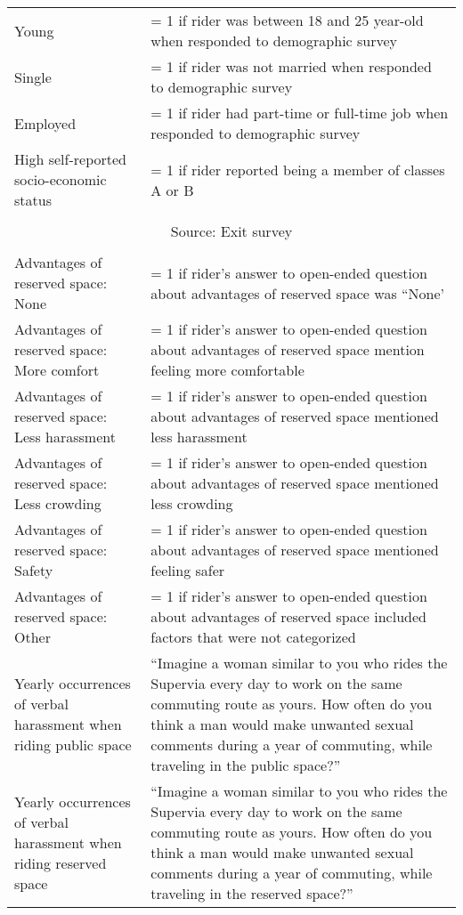 \begin{table}[H]
\begin{tabular}{p{.4\linewidth}p{.6\linewidth}}
Young	&	= 1 if rider was between 18 and 25 year-old when responded to demographic survey	\\
Single	&	= 1 if rider was not married when responded to demographic survey	\\
Employed	&	= 1 if rider had part-time or full-time job when responded to demographic survey	\\
High self-reported socio-economic status	&	= 1 if rider reported being a member of classes A or B	\\\\[-1.8ex]
\hline
\multicolumn{2}{c}{Source: Exit survey} \\
\hline\\[-1.8ex]
Advantages of reserved space: None	&		= 1 if rider's answer to open-ended question about advantages of reserved space was ``None'	\\
Advantages of reserved space: More comfort	&		= 1 if rider's answer to open-ended question about advantages of reserved space mention feeling more comfortable	\\
Advantages of reserved space: Less harassment	&		= 1 if rider's answer to open-ended question about advantages of reserved space mentioned less harassment	\\
Advantages of reserved space: Less crowding	&		= 1 if rider's answer to open-ended question about advantages of reserved space mentioned less crowding	\\
Advantages of reserved space: Safety	&		= 1 if rider's answer to open-ended question about advantages of reserved space mentioned feeling safer	\\
Advantages of reserved space: Other	&		= 1 if rider's answer to open-ended question about advantages of reserved space included factors that were not categorized	\\
Yearly occurrences of verbal harassment when riding public space	    & ``Imagine a woman similar to you who rides the Supervia every day to work on the same commuting route as yours. How often do you think a man would make unwanted sexual comments during a year of commuting, while traveling in the public space?'' \\
Yearly occurrences of verbal harassment when riding reserved space	    & ``Imagine a woman similar to you who rides the Supervia every day to work on the same commuting route as yours. How often do you think a man would make unwanted sexual comments during a year of commuting, while traveling in the reserved space?'' \\
    \hline\hline
    \end{tabular}
\end{table}

